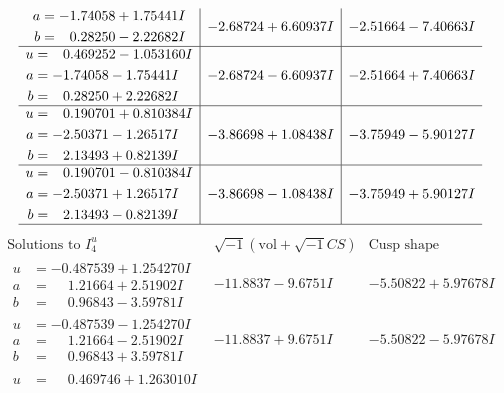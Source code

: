 \documentclass[1p]{elsarticle_modified}
\theoremstyle{definition}
\newcommand{\I}{\sqrt{-1}}
\begin{document}
$$\begin{array}{c|c|c}
\begin{aligned}
a &= -1.74058 + 1.75441 I \\
b &= \phantom{-}0.28250 - 2.22682 I\end{aligned}
 & -2.68724 + 6.60937 I & -2.51664 - 7.40663 I \\ \hline\begin{aligned}
u &= \phantom{-}0.469252 - 1.053160 I \\
a &= -1.74058 - 1.75441 I \\
b &= \phantom{-}0.28250 + 2.22682 I\end{aligned}
 & -2.68724 - 6.60937 I & -2.51664 + 7.40663 I \\ \hline\begin{aligned}
u &= \phantom{-}0.190701 + 0.810384 I \\
a &= -2.50371 - 1.26517 I \\
b &= \phantom{-}2.13493 + 0.82139 I\end{aligned}
 & -3.86698 + 1.08438 I & -3.75949 - 5.90127 I \\ \hline\begin{aligned}
u &= \phantom{-}0.190701 - 0.810384 I \\
a &= -2.50371 + 1.26517 I \\
b &= \phantom{-}2.13493 - 0.82139 I\end{aligned}
 & -3.86698 - 1.08438 I & -3.75949 + 5.90127 I\\
 \hline 
 \end{array}$$\newpage$$\begin{array}{c|c|c}  
\text{Solutions to }I^u_{4}& \I (\text{vol} + \sqrt{-1}CS) & \text{Cusp shape}\\
 \hline 
\begin{aligned}
u &= -0.487539 + 1.254270 I \\
a &= \phantom{-}1.21664 + 2.51902 I \\
b &= \phantom{-}0.96843 - 3.59781 I\end{aligned}
 & -11.8837 - 9.6751 I & -5.50822 + 5.97678 I \\ \hline\begin{aligned}
u &= -0.487539 - 1.254270 I \\
a &= \phantom{-}1.21664 - 2.51902 I \\
b &= \phantom{-}0.96843 + 3.59781 I\end{aligned}
 & -11.8837 + 9.6751 I & -5.50822 - 5.97678 I \\ \hline\begin{aligned}
u &= \phantom{-}0.469746 + 1.263010 I \\

\end{aligned}
\end{array}$$
\end{document}

